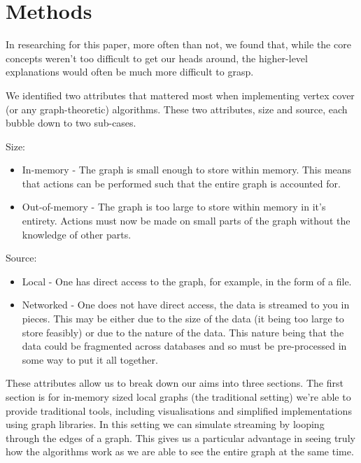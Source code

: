 \section{Methods}

In researching for this paper, more often than not, we found that, while the
core concepts weren't too difficult to get our heads around, the higher-level
explanations would often be much more difficult to grasp.

We identified two attributes that mattered most when implementing vertex cover
(or any graph-theoretic) algorithms. These two attributes, size and source,
each bubble down to two sub-cases.

Size:

\begin{itemize}
    \item
          In-memory - The graph is small enough to store within memory. This
          means that actions can be performed such that the entire graph is
          accounted for.
    \item
          Out-of-memory - The graph is too large to store within memory in it's
          entirety. Actions must now be made on small parts of the graph
          without the knowledge of other parts.
\end{itemize}

Source:

\begin{itemize}
    \item
          Local - One has direct access to the graph, for example, in the form
          of a file.
    \item
          Networked - One does not have direct access, the data is streamed to
          you in pieces. This may be either due to the size of the data (it
          being too large to store feasibly) or due to the nature of the data.
          This nature being that the data could be fragmented across databases
          and so must be pre-processed in some way to put it all together.
\end{itemize}

These attributes allow us to break down our aims into three sections. The first
section is for in-memory sized local graphs (the traditional setting) we're
able to provide traditional tools, including visualisations and simplified
implementations using graph libraries. In this setting we can simulate
streaming by looping through the edges of a graph. This gives us a particular
advantage in seeing truly how the algorithms work as we are able to see the
entire graph at the same time.


